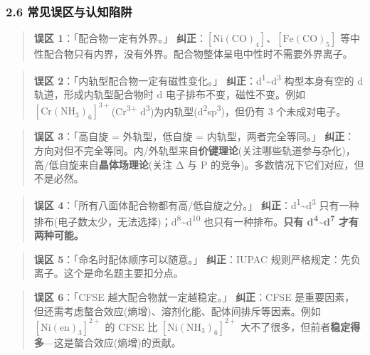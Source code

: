 \documentclass[a4paper,11pt]{ctexart}
\newcommand{\箭}{\ensuremath{\rightarrow}}
\newcommand{\左箭}{\ensuremath{\leftarrow}}
\newcommand{\上箭}{\ensuremath{\uparrow}}
\newcommand{\下箭}{\ensuremath{\downarrow}}
\newcommand{\衡}{\ensuremath{\rightleftharpoons}}
\newcommand{\双箭}{\ensuremath{\leftrightarrow}}
\newcommand{\约等于}{\ensuremath{\approx}}
\newcommand{\小于等于}{\ensuremath{\leq}}
\newcommand{\大于等于}{\ensuremath{\geq}}
\newcommand{\不等于}{\ensuremath{\neq}}
\newcommand{\西格马}{\ensuremath{\sigma}}
\newcommand{\派}{\ensuremath{\pi}}
\begin{document}
\subsubsection{2.6 常见误区与认知陷阱}\label{ux5e38ux89c1ux8befux533aux4e0eux8ba4ux77e5ux9677ux9631}

\begin{quote}
\textbf{误区 1}：「配合物一定有外界。」
\textbf{纠正}：\(\mathrm{[Ni(CO)_4]}\)、\(\mathrm{[Fe(CO)_5]}\) 等中性配合物只有内界，没有外界。配合物整体呈电中性时不需要外界离子。
\end{quote}

\begin{quote}
\textbf{误区 2}：「内轨型配合物一定有磁性变化。」
\textbf{纠正}：d\textsuperscript{1}\textasciitilde d\textsuperscript{3} 构型本身有空的 d 轨道，形成内轨型配合物时 d 电子排布不变，磁性不变。例如 \([\mathrm{Cr(NH_3)_6}]^{3+}\)(Cr\textsuperscript{3+} d\textsuperscript{3})为内轨型(d\textsuperscript{2}sp\textsuperscript{3})，但仍有 3 个未成对电子。
\end{quote}

\begin{quote}
\textbf{误区 3}：「高自旋 = 外轨型，低自旋 = 内轨型，两者完全等同。」
\textbf{纠正}：方向对但不完全等同。内/外轨型来自\textbf{价键理论}(关注哪些轨道参与杂化)，高/低自旋来自\textbf{晶体场理论}(关注 Δ 与 P 的竞争)。多数情况下它们对应，但不是必然。
\end{quote}

\begin{quote}
\textbf{误区 4}：「所有八面体配合物都有高/低自旋之分。」
\textbf{纠正}：d\textsuperscript{1}\textasciitilde d\textsuperscript{3} 只有一种排布(电子数太少，无法选择)；d\textsuperscript{8}\textasciitilde d\textsuperscript{10} 也只有一种排布。\textbf{只有 d\textsuperscript{4}\textasciitilde d\textsuperscript{7} 才有两种可能。}
\end{quote}

\begin{quote}
\textbf{误区 5}：「命名时配体顺序可以随意。」
\textbf{纠正}：IUPAC 规则严格规定：先负离子。这个是命名题主要扣分点。
\end{quote}

\begin{quote}
\textbf{误区 6}：「CFSE 越大配合物就一定越稳定。」
\textbf{纠正}：CFSE 是重要因素，但还需考虑螯合效应(熵增)、溶剂化能、配体间排斥等因素。例如 \([\mathrm{Ni(en)_3}]^{2+}\) 的 CFSE 比 \([\mathrm{Ni(NH_3)_6}]^{2+}\) 大不了很多，但前者\textbf{稳定得多}---这是螯合效应(熵增)的贡献。
\end{quote}
\end{document}
